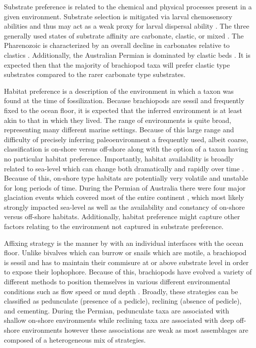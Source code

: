 \documentclass[12pt,letterpaper]{article}
\begin{document}
Substrate preference is related to the chemical and physical processes present in a given environment. Substrate selection is mitigated via larval chemosensory abilities and thus may act as a weak proxy for larval dispersal ability \citep{Jablonski2006a,Jablonski1983}. The three generally used states of substrate affinity are carbonate, clastic, or mixed \citep{Foote2006,Anderson2011a,Nurnberg2013a,Kiessling2007a,Miller2001}. The Pharenozoic is characterized by an overall decline in carbonates relative to clastics \citep{Foote2006,Miller2001}. Additionally, the Australian Permian is dominated by clastic beds \citep{Birgenheier2010,Percival2012,Thomas2007,Fielding2008a,Fielding2008}. It is expected then that the majority of brachiopod taxa will prefer clastic type substrates compared to the rarer carbonate type substrates.

Habitat preference is a description of the environment in which a taxon was found at the time of fossilization. Because brachiopods are sessil and frequently fixed to the ocean floor, it is expected that the inferred environment is at least akin to that in which they lived. The range of environments is quite broad, representing many different marine settings. Because of this large range and difficulty of precisely inferring paleoenvironment a frequently used, albeit coarse, classification is on-shore versus off-shore \citep{Sepkoski1991,Kiessling2007a,Bottjer1988,Jablonski1991,Jablonski1983b} along with the option of a taxon having no particular habitat preference. Importantly, habitat availability is broadly related to sea-level which can change both dramatically and rapidly over time \citep{Olszewski2004}. Because of this, on-shore type habitats are potentially very volatile and unstable for long periods of time. During the Permian of Australia there were four major glaciation events which covered most of the entire continent \citep{Fielding2008,Birgenheier2010,Fielding2008a,Fielding2006}, which most likely strongly impacted sea-level as well as the availability and constancy of on-shore versus off-shore habitats. Additionally, habitat preference might capture other factors relating to the environment not captured in substrate preference. 

Affixing strategy is the manner by with an individual interfaces with the ocean floor. Unlike bivalves which can burrow or snails which are motile, a brachiopod is sessil and has to maintain their commisure at or above substrate level in order to expose their lophophore. Because of this, brachiopods have evolved a variety of different methods to position themselves in various different environmental conditions such as flow speed or mud depth \citep{Rudwick1970,Alexander1977,LaBarbera1978,LaBarbera1981,Richardson1997}. Broadly, these strategies can be classified as pedunculate (presence of a pedicle), reclining (absence of pedicle), and cementing. During the Permian, pedunculate taxa are associated with shallow on-shore environments while reclining taxa are associated with deep off-shore environments \citep{Clapham2007} however these associations are weak as most assemblages are composed of a heterogeneous mix of strategies.
\end{document}
